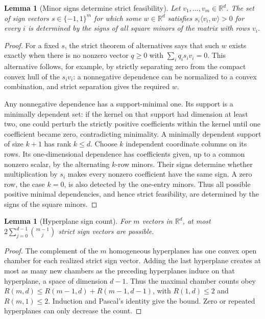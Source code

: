\documentclass[11pt]{article}
\newtheorem{lemma}[theorem]{Lemma}
\begin{document}
\begin{lemma}[Minor signs determine strict feasibility]
Let $v_1,\ldots,v_m\in\mathbb R^d$. The set of sign vectors
$s\in\{-1,1\}^m$ for which some $w\in\mathbb R^d$ satisfies
$s_i\langle v_i,w\rangle>0$ for every $i$ is determined by the signs
of all square minors of the matrix with rows $v_i$.
\end{lemma}
\begin{proof}
For a fixed $s$, the strict theorem of alternatives says that such
$w$ exists exactly when there is no nonzero vector $q\geq0$ with
$\sum_iq_i s_iv_i=0$. This alternative follows, for example, by
strictly separating zero from the compact convex hull of the
$s_iv_i$: a nonnegative dependence can be normalized to a convex
combination, and strict separation gives the required $w$.

Any nonnegative dependence has a support-minimal one. Its support
is a minimally dependent set: if the kernel on that support had
dimension at least two, one could perturb the strictly positive
coefficients within the kernel until one coefficient became zero,
contradicting minimality. A minimally dependent support of size
$k+1$ has rank $k\leq d$. Choose $k$ independent coordinate columns
on its rows. Its one-dimensional dependence has coefficients given,
up to a common nonzero scalar, by the alternating $k$-row minors.
Their signs determine whether multiplication by $s_i$ makes every
nonzero coefficient have the same sign. A zero row, the case $k=0$,
is also detected by the one-entry minors. Thus all possible positive
minimal dependencies, and hence strict feasibility, are determined
by the signs of the square minors.
\end{proof}

\begin{lemma}[Hyperplane sign count]
For $m$ vectors in $\mathbb R^d$, at most
$2\sum_{j=0}^{d-1}\binom{m-1}{j}$ strict sign vectors are possible.
\end{lemma}
\begin{proof}
The complement of the $m$ homogeneous hyperplanes has one convex
open chamber for each realized strict sign vector. Adding the last
hyperplane creates at most as many new chambers as the preceding
hyperplanes induce on that hyperplane, a space of dimension $d-1$.
Thus the maximal chamber counts obey
$R(m,d)\leq R(m-1,d)+R(m-1,d-1)$, with $R(1,d)\leq2$ and
$R(m,1)\leq2$. Induction and Pascal's identity give the bound.
Zero or repeated hyperplanes can only decrease the count.
\end{proof}
\end{document}
